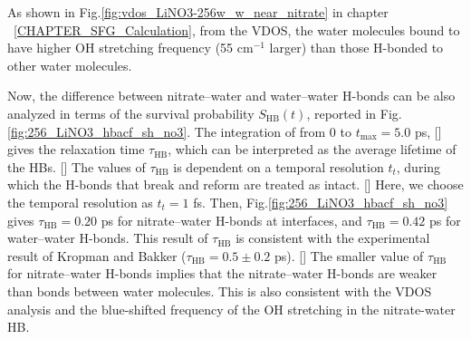 As shown in Fig.\space\ref{fig:vdos_LiNO3-256w_w_near_nitrate} in chapter ~\ref{CHAPTER_SFG_Calculation}, 
from the VDOS, the water molecules bound to \nitrate have higher OH stretching frequency (55 cm$^{-1}$ larger) 
than those H-bonded to other water molecules. 

Now, the difference between nitrate--water and water--water H-bonds 
can be also analyzed in terms of the survival probability $S_{\text{HB}}(t)$,
\cite{AKS86,JT90,AL96} 
reported in Fig.\space\ref {fig:256_LiNO3_hbacf_sh_no3}.
The integration of \SHB from 0 to $t_{\max}=5.0$ ps, [\cite{Steinel2004}] gives the relaxation time $\tau_\text{HB}$, which can be interpreted as 
the average lifetime of the HBs. [\cite{SC02}] 
The values of $\tau_{\text{HB}}$ is dependent on a temporal resolution $t_t$, during which the H-bonds that break and reform are treated as intact. [\cite{AL00}] Here, 
we choose the temporal resolution as $t_t=1$ fs. 
Then, Fig.\space\ref {fig:256_LiNO3_hbacf_sh_no3} gives $\tau_\text{HB}=0.20$ ps for nitrate--water H-bonds at interfaces, and $\tau_\text{HB}=0.42$ ps for water--water H-bonds.
This result of $\tau_\text{HB}$ is consistent with the experimental result of Kropman and Bakker ($\tau_\text{HB}=0.5\pm0.2$ ps). [\cite{MFK01}]
The smaller value of $\tau_\text{HB}$ for nitrate--water H-bonds implies that the nitrate--water H-bonds are weaker than bonds between water molecules. 
This is also consistent with the VDOS analysis and the blue-shifted frequency of the OH stretching in the nitrate-water HB.

\FloatBarrier
